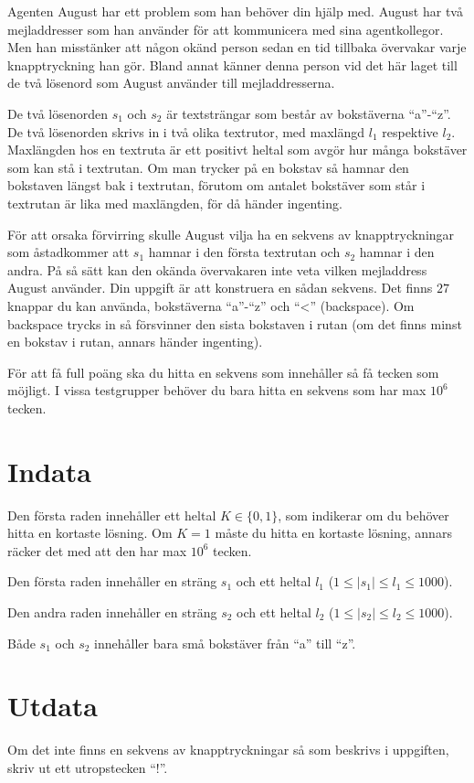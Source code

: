 
Agenten August har ett problem som han behöver din hjälp med. August har två mejladdresser som han använder
för att kommunicera med sina agentkollegor. Men han misstänker att någon okänd person sedan en tid tillbaka 
övervakar varje knapptryckning han gör. Bland annat känner denna person vid det här laget till de två lösenord
 som August använder till mejladdresserna. 
 
De två lösenorden $s_1$ och $s_2$ är textsträngar som består av bokstäverna ``a''-``z''. De två lösenorden skrivs 
in i två olika textrutor, med maxlängd $l_1$ respektive $l_2$. Maxlängden hos en textruta är ett positivt heltal 
som avgör hur många bokstäver som kan stå i textrutan. Om man trycker på en bokstav så hamnar den bokstaven längst 
bak i textrutan, förutom om antalet bokstäver som står i textrutan är lika med maxlängden, för då händer ingenting. 

För att orsaka förvirring skulle August vilja ha en sekvens av knapptryckningar som åstadkommer att $s_1$ hamnar 
i den första textrutan och $s_2$ hamnar i den andra. På så sätt kan den okända övervakaren inte veta vilken 
mejladdress August använder. Din uppgift är att konstruera en sådan sekvens. Det finns $27$ knappar du kan använda, 
bokstäverna ``a''-``z'' och ``<'' (backspace). Om backspace trycks in så försvinner den sista bokstaven i rutan 
(om det finns minst en bokstav i rutan, annars händer ingenting).

För att få full poäng ska du hitta en sekvens som innehåller så få tecken som möjligt. I vissa testgrupper behöver 
du bara hitta en sekvens som har max $10^6$ tecken.


\section*{Indata}
Den första raden innehåller ett heltal $K \in \{0, 1\}$, som indikerar om du behöver hitta en kortaste lösning. 
Om $K = 1$ måste du hitta en kortaste lösning, annars räcker det med att den har max $10^6$ tecken.

Den första raden innehåller en sträng $s_1$ och ett heltal $l_1$ ($1 \leq |s_1| \leq l_1 \leq 1000$).

Den andra raden innehåller en sträng $s_2$ och ett heltal $l_2$ ($1 \leq |s_2| \leq l_2 \leq 1000$).

Både $s_1$ och $s_2$ innehåller bara små bokstäver från ``a'' till ``z''.

\section*{Utdata}
Om det inte finns en sekvens av knapptryckningar så som beskrivs i uppgiften, skriv ut ett utropstecken ``!''.

